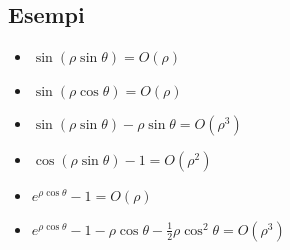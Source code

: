 \subsection{Esempi}

\begin{itemize}
	\item \( \sin(\rho \sin \theta) = O(\rho) \)
	\item \( \sin(\rho \cos \theta) = O(\rho) \)
	\item \( \sin(\rho \sin \theta) - \rho \sin \theta = O(\rho^3) \)
	\item \( \cos(\rho \sin \theta) - 1 = O(\rho^2) \)
	\item \( e^{\rho \cos \theta} - 1 = O(\rho) \)
	\item \( e^{\rho \cos \theta} - 1 - \rho \cos \theta - \frac{1}{2} \rho \cos^2 \theta = O(\rho^3) \)
\end{itemize}